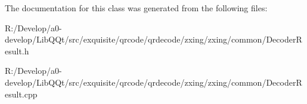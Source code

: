 The documentation for this class was generated from the following files\+:\begin{DoxyCompactItemize}
\item 
R\+:/\+Develop/a0-\/develop/\+Lib\+Q\+Qt/src/exquisite/qrcode/qrdecode/zxing/zxing/common/Decoder\+Result.\+h\item 
R\+:/\+Develop/a0-\/develop/\+Lib\+Q\+Qt/src/exquisite/qrcode/qrdecode/zxing/zxing/common/Decoder\+Result.\+cpp\end{DoxyCompactItemize}
